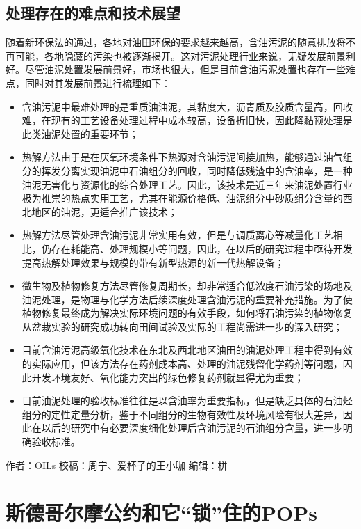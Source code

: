 \documentclass[
]{book}
\begin{document}
\hypertarget{ux5904ux7406ux5b58ux5728ux7684ux96beux70b9ux548cux6280ux672fux5c55ux671b}{%
\subsection{处理存在的难点和技术展望}\label{ux5904ux7406ux5b58ux5728ux7684ux96beux70b9ux548cux6280ux672fux5c55ux671b}}

随着新环保法的通过，各地对油田环保的要求越来越高，含油污泥的随意排放将不再可能，各地隐藏的污染也被逐渐揭开。这对污泥处理行业来说，无疑发展前景利好。尽管油泥处置发展前景好，市场也很大，但是目前含油污泥处置也存在一些难点，同时对其发展前景进行梳理如下：

\begin{itemize}
\item
  含油污泥中最难处理的是重质油油泥，其黏度大，沥青质及胶质含量高，回收难，在现有的工艺设备处理过程中成本较高，设备折旧快，因此降黏预处理是此类油泥处置的重要环节；
\item
  热解方法由于是在厌氧环境条件下热源对含油污泥间接加热，能够通过油气组分的挥发分离实现油泥中石油组分的回收，同时降低残渣中的含油率，是一种油泥无害化与资源化的综合处理工艺。因此，该技术是近三年来油泥处置行业极为推崇的热点实用工艺，尤其在能源价格低、油泥组分中砂质组分含量的西北地区的油泥，更适合推广该技术；
\item
  热解方法尽管处理含油污泥非常实用有效，但是与调质离心等减量化工艺相比，仍存在耗能高、处理规模小等问题，因此，在以后的研究过程中亟待开发提高热解处理效果与规模的带有新型热源的新一代热解设备；
\item
  微生物及植物修复方法尽管修复周期长，却非常适合低浓度石油污染的场地及油泥处理，是物理与化学方法后续深度处理含油污泥的重要补充措施。为了使植物修复最终成为解决实际环境问题的有效手段，如何将石油污染的植物修复从盆栽实验的研究成功转向田间试验及实际的工程尚需进一步的深入研究；
\item
  目前含油污泥高级氧化技术在东北及西北地区油田的油泥处理工程中得到有效的实际应用，但该方法存在药剂成本高、处理的油泥残留化学药剂等问题，因此开发环境友好、氧化能力突出的绿色修复药剂就显得尤为重要；
\item
  目前油泥处理的验收标准往往是以含油率为重要指标，但是缺乏具体的石油烃组分的定性定量分析，鉴于不同组分的生物有效性及环境风险有很大差异，因此在以后的研究中有必要深度细化处理后含油污泥的石油组分含量，进一步明确验收标准。
\end{itemize}

作者：OILs
校稿：周宁、爱杯子的王小咖
编辑：栟

\hypertarget{ux65afux5fb7ux54e5ux5c14ux6469ux516cux7ea6ux548cux5b83ux9501ux4f4fux7684pops}{%
\section{斯德哥尔摩公约和它``锁''住的POPs}\label{ux65afux5fb7ux54e5ux5c14ux6469ux516cux7ea6ux548cux5b83ux9501ux4f4fux7684pops}}
\end{document}
